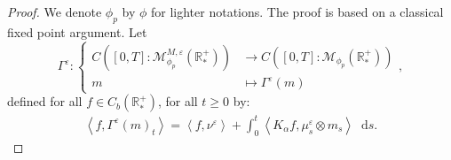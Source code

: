 \documentclass[11pt,a4paper]{article}
\newcommand{\RR}{\mathbb{R}}
\newcommand{\RRP}{\mathbb{R}^+_*}
\newcommand{\MC}{\mathcal{M}}
\newcommand{\brac}[1]{\left\langle#1\right\rangle}
\newcommand{\dd}{\mathop{}\!\mathrm{d}}
\begin{document}
\begin{proof}
    We denote $\phi_p$ by $\phi$ for lighter notations. The proof is based on a classical fixed point argument. Let 
    \[ \Gamma^\varepsilon : 
    \left\lbrace 
    \begin{aligned}
        C\left([0,T]:\MC^{M,\varepsilon}_{\phi_p}\left(\RRP\right) \right) &\to C\left([0,T]:\MC_{\phi_p}\left(\RRP\right) \right)\\
         m & \mapsto \Gamma^\varepsilon(m)
    \end{aligned}
    \right.,
    \]
    defined for all $f \in C_b\left( \RR_*^+\right)$, for all $t \geq 0$ by:
    \begin{align*}
        \brac{f,\Gamma^\varepsilon(m)_t} = \brac{f,\nu^\varepsilon} + \int_0^t \brac{K_\alpha f,\mu^\varepsilon_s\otimes m_s} \dd s.
    \end{align*}


\end{proof}
\end{document}

